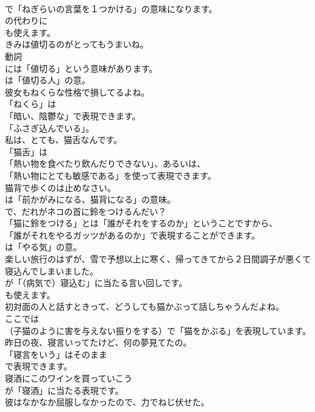 \documentclass[8pt]{extreport}
\begin{document}
\begin{CJK}{UTF8}{min}
\\	で「ねぎらいの言葉を１つかける」の意味になります。
\\	の代わりに 
\\	も使えます。	
\\	きみは値切るのがとってもうまいね。 
\\	動詞 
\\	には「値切る」という意味があります。
\\	は「値切る人」の意。	
\\	彼女もねくらな性格で損してるよね。 
\\	「ねくら」は
\\	「暗い、陰鬱な」で表現できます。
\\	「ふさぎ込んでいる」。	
\\	私は、とても、猫舌なんです。 
\\	「猫舌」は
\\	「熱い物を食べたり飲んだりできない」、あるいは、
\\	「熱い物にとても敏感である」を使って表現できます。	
\\	猫背で歩くのは止めなさい。 
\\	は「前かがみになる、猫背になる」の意味。	
\\	で、だれがネコの首に鈴をつけるんだい？ 
\\	「猫に鈴をつける」とは「誰がそれをするのか」ということですから、
\\	「誰がそれをやるガッツがあるのか」で表現することができます。
\\	は「やる気」の意。	
\\	楽しい旅行のはずが、雪で予想以上に寒く、帰ってきてから２日間調子が悪くて寝込んでしまいました。 
\\	が「（病気で）寝込む」に当たる言い回しです。
\\	も使えます。	
\\	初対面の人と話すときって、どうしても猫かぶって話しちゃうんだよね。 
\\	ここでは 
\\	（子猫のように害を与えない振りをする）で「猫をかぶる」を表現しています。	
\\	昨日の夜、寝言いってたけど、何の夢見てたの。 
\\	「寝言をいう」はそのまま
\\	で表現できます。	
\\	寝酒にこのワインを買っていこう 
\\	が「寝酒」に当たる表現です。	
\\	彼はなかなか屈服しなかったので、力でねじ伏せた。 

\end{CJK}
\end{document}

